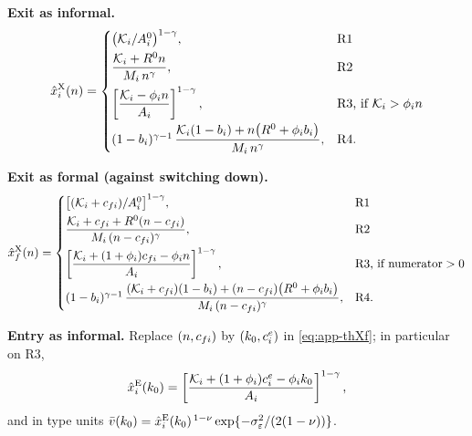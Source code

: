 \documentclass[12pt]{article}
\begin{document}
\textbf{Exit as informal.}
\begin{equation}
  \hat{x}^{\mathrm{X}}_{i}(n)=
  \begin{cases}
    \big(\mathcal{K}_{i}/A^{0}_{i}\big)^{1-\gamma},
      & \text{R1}\\[3pt]
    \dfrac{\mathcal{K}_{i}+R^{0}n}{M_{i}\,n^{\gamma}},
      & \text{R2}\\[8pt]
    \left[\dfrac{\mathcal{K}_{i}-\phi_{i}n}
    {A_{i}}\right]^{1-\gamma},
      & \text{R3, if } \mathcal{K}_{i}>\phi_{i}n\\[8pt]
    (1-b_{i})^{\gamma-1}\,
    \dfrac{\mathcal{K}_{i}(1-b_{i})
    +n\big(R^{0}+\phi_{i}b_{i}\big)}
    {M_{i}\,n^{\gamma}},
      & \text{R4}.
  \end{cases}
  \label{eq:app-thXi}
\end{equation}
 
\textbf{Exit as formal (against switching down).}
\begin{equation}
  \hat{x}^{\mathrm{X}}_{f}(n)=
  \begin{cases}
    \big[(\mathcal{K}_{i}+c_{fi})/A^{0}_{i}\big]^{1-\gamma},
      & \text{R1}\\[3pt]
    \dfrac{\mathcal{K}_{i}+c_{fi}
    +R^{0}(n-c_{fi})}
    {M_{i}\,(n-c_{fi})^{\gamma}},
      & \text{R2}\\[8pt]
    \left[\dfrac{\mathcal{K}_{i}+(1+\phi_{i})c_{fi}
    -\phi_{i}n}{A_{i}}\right]^{1-\gamma},
      & \text{R3, if numerator}>0\\[8pt]
    (1-b_{i})^{\gamma-1}\,
    \dfrac{(\mathcal{K}_{i}+c_{fi})(1-b_{i})
    +(n-c_{fi})
    \big(R^{0}+\phi_{i}b_{i}\big)}
    {M_{i}\,(n-c_{fi})^{\gamma}},
      & \text{R4}.
  \end{cases}
  \label{eq:app-thXf}
\end{equation}
 
\textbf{Entry as informal.}
Replace $(n,c_{fi})$ by $(k_{0},c^{e}_{i})$ in
\eqref{eq:app-thXf}; in particular on R3,
\begin{equation}
  \hat{x}^{\mathrm{E}}_{i}(k_{0})
  =\left[\frac{\mathcal{K}_{i}+(1+\phi_{i})c^{e}_{i}
  -\phi_{i}k_{0}}{A_{i}}\right]^{1-\gamma},
  \label{eq:app-thEi}
\end{equation}
and in type units
$\bar{v}(k_{0})=\hat{x}^{\mathrm{E}}_{i}(k_{0})^{\,1-\nu}
\exp\{-\sigma^{2}_{\varepsilon}/(2(1-\nu))\}$.
 
\end{document}
